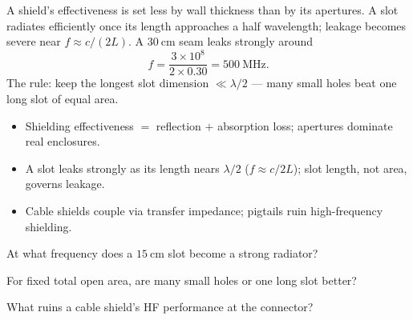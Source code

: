 \begin{workedexample}
A shield's effectiveness is set less by wall thickness than by its
apertures. A slot radiates efficiently once its length approaches a half
wavelength; leakage becomes severe near $f \approx c/(2L)$. A $30\ \text{cm}$ seam
leaks strongly around
\[ f = \frac{3\times10^8}{2\times0.30} = 500\ \text{MHz}. \]
The rule: keep the longest slot dimension $\ll \lambda/2$ --- many small holes
beat one long slot of equal area.
\end{workedexample}

\begin{keytakeaways}
\begin{itemize}[leftmargin=1.4em,itemsep=2pt]
\item Shielding effectiveness $=$ reflection $+$ absorption loss; apertures dominate real enclosures.
\item A slot leaks strongly as its length nears $\lambda/2$ ($f \approx c/2L$); slot length, not area, governs leakage.
\item Cable shields couple via transfer impedance; pigtails ruin high-frequency shielding.
\end{itemize}
\end{keytakeaways}

\begin{exercises}
\item At what frequency does a $15\ \text{cm}$ slot become a strong radiator?
\item For fixed total open area, are many small holes or one long slot better?
\item What ruins a cable shield's HF performance at the connector?
\end{exercises}

